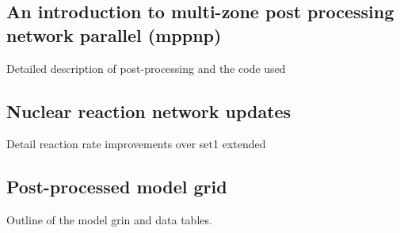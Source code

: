 \subsection{An introduction to multi-zone post processing network parallel (mppnp)}

Detailed description of post-processing and the code used

\subsection{Nuclear reaction network updates}

Detail reaction rate improvements over set1 extended

\subsection{Post-processed model grid}

Outline of the model grin and data tables.